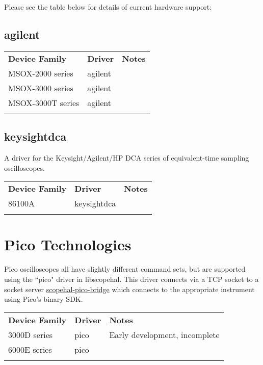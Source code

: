 Please see the table below for details of current hardware support:

\subsection{agilent}

\begin{tabularx}{16cm}{llX}
\thickhline
\textbf{Device Family} & \textbf{Driver} & \textbf{Notes} \\
\thickhline
MSOX-2000 series & agilent &  \\
\thickhline
MSOX-3000 series & agilent &  \\
\thickhline
MSOX-3000T series & agilent &  \\
\thickhline
\end{tabularx}

\subsection{keysightdca}

A driver for the Keysight/Agilent/HP DCA series of equivalent-time sampling oscilloscopes.

\begin{tabularx}{16cm}{llX}
\thickhline
\textbf{Device Family} & \textbf{Driver} & \textbf{Notes} \\
\thickhline
86100A & keysightdca &  \\
\thickhline
\end{tabularx}

\section{Pico Technologies}

Pico oscilloscopes all have slightly different command sets, but are supported using the ``pico" driver in libscopehal.
This driver connects via a TCP socket to a socket server
\href{https://github.com/glscopeclient/scopehal-pico-bridge}{scopehal-pico-bridge} which connects to the appropriate
instrument using Pico's binary SDK.

\begin{tabularx}{16cm}{llX}
\thickhline
\textbf{Device Family} & \textbf{Driver} & \textbf{Notes} \\
\thickhline
3000D series & pico & Early development, incomplete\\
\thinhline
6000E series & pico & \\
\thickhline
\end{tabularx}

